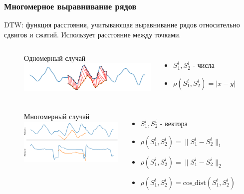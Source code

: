 \documentclass{beamer}
\begin{document}
\begin{frame}
\frametitle{Многомерное выравнивание рядов}
    \begin{block}{}
        DTW: функция расстояния, учитывающая выравнивание рядов относительно сдвигов и сжатий.
        Использует расстояние между точками. 
    \end{block}    
    \begin{figure}
        \begin{columns}

               \centering
               Одномерный случай
               \includegraphics[width=\linewidth]{img1.pdf}
            \begin{itemize}
                \item  $S_1^i, S_2^i$ \-- числа
                \item  $\rho(S_1^i, S_2^i) = | x - y |$
            \end{itemize}
        \end{columns} 
        \begin{columns}
                \centering
               Многомерный случай
               \includegraphics[width=\linewidth]{img2.pdf}
            \begin{itemize}
                \item  $S_1^i, S_2^i $ \-- вектора
                \item  $\rho(S_1^i, S_2^i) = \|S_1^i - S_2^i\|_1$
                \item  $\rho(S_1^i, S_2^i) = \|S_1^i - S_2^i\|_2$
                \item  $\rho(S_1^i, S_2^i) = \text{cos\_dist}(S_1^i, S_2^i)$          
            \end{itemize}

        \end{columns} 
    \end{figure}
\end{frame}    
\end{document}
